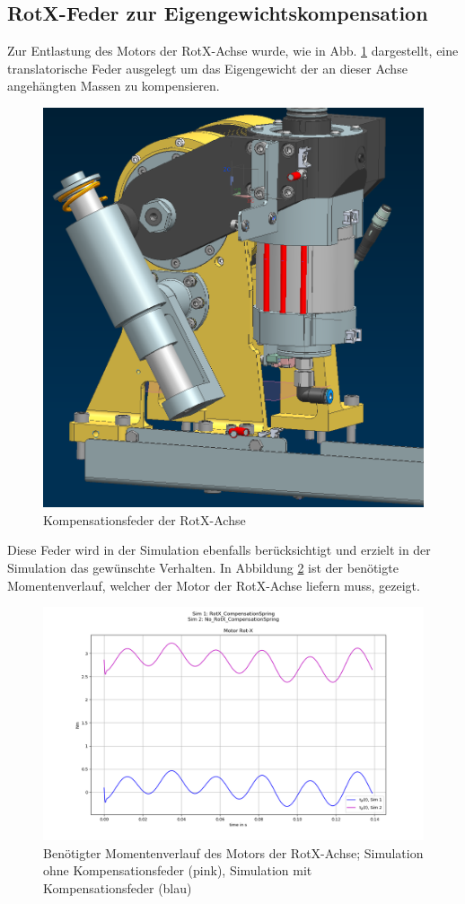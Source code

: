\documentclass[10pt,a4paper]{iace.report}
\begin{document}
		\subsection{RotX-Feder zur Eigengewichtskompensation}
			Zur Entlastung des Motors der RotX-Achse wurde, wie in Abb. \ref{fig:rotXspring} dargestellt, eine translatorische Feder ausgelegt um das Eigengewicht der an dieser Achse angehängten Massen zu kompensieren.
			\begin{figure}[!h]
				\centering
				\includegraphics[width=0.5\linewidth]{./pics/rotXspring.png}
				\caption{Kompensationsfeder der RotX-Achse}
				\label{fig:rotXspring}
			\end{figure} 
			Diese Feder wird in der Simulation ebenfalls berücksichtigt und erzielt in der Simulation das gewünschte Verhalten. In Abbildung \ref{fig:M_rotXspring} ist der benötigte Momentenverlauf, welcher der Motor der RotX-Achse liefern muss, gezeigt.
			\begin{figure}[!h]
				\centering
				\includegraphics[width=0.99\linewidth]{./pics/M_rotXspring.png}
				\caption{Benötigter Momentenverlauf des Motors der RotX-Achse; Simulation ohne Kompensationsfeder (pink), Simulation mit Kompensationsfeder (blau)}
				\label{fig:M_rotXspring}
			\end{figure} 
\end{document}
